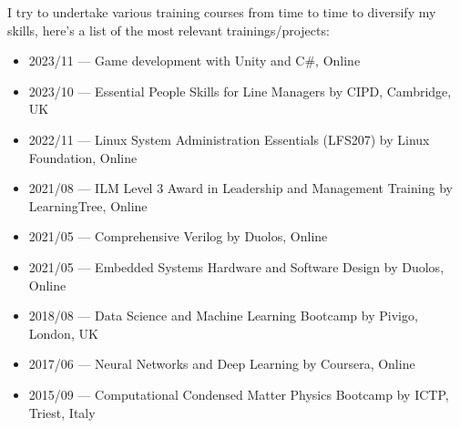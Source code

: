 \documentclass[10pt,a4paper,ragged2e,withhyper]{altacv}
\begin{document}



I try to undertake various training courses from time to time to diversify my skills,
here's a list of the most relevant trainings/projects:

\begin{itemize}
    
    \item
    2023/11 --- Game development with Unity and C\#, Online
    
    \item
    2023/10 --- Essential People Skills for Line Managers by CIPD, Cambridge, UK

    \item
    2022/11 --- Linux System Administration Essentials (LFS207) by Linux Foundation, Online
    
    \item
    2021/08 --- ILM Level 3 Award in Leadership and Management Training by LearningTree, Online
    
    \item
    2021/05 --- Comprehensive Verilog by Duolos, Online
    
    \item
    2021/05 --- Embedded Systems Hardware and Software Design by Duolos, Online
    
    \item
    2018/08 --- Data Science and Machine Learning Bootcamp by Pivigo, London, UK
    
    \item
    2017/06 --- Neural Networks and Deep Learning by Coursera, Online
    
    \item
    2015/09 --- Computational Condensed Matter Physics Bootcamp by ICTP, Triest, Italy
    
\end{itemize}
\end{document}
